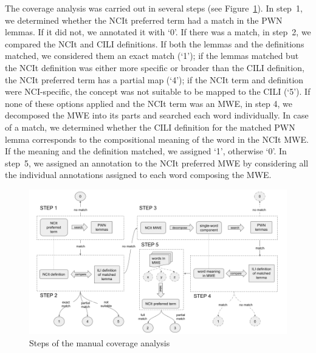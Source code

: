 \documentclass[11pt]{article}
\begin{document}
The coverage analysis was carried out in several steps (see Figure~\ref{steps}). 
In step~1, we determined whether the NCIt preferred term had a match in the PWN lemmas. If it did not, we annotated it with `0'. %
If there was a match, in step~2, we compared the NCIt and CILI definitions. If both the lemmas and the definitions matched, we considered them an exact match (`1'); if the lemmas matched but the NCIt definition was either more specific or broader than the CILI definition, the NCIt preferred term has a partial map (`4'); if the NCIt term and definition were NCI-specific, the concept was not suitable to be mapped to the CILI (`5'). If none of these options applied and the NCIt term was an MWE, in step 4, we decomposed the MWE into its parts and searched each word individually. In case of a match, we determined whether the CILI definition for the matched PWN lemma corresponds to the compositional meaning of the word in the NCIt MWE. If the meaning and the definition matched, we assigned `1',  otherwise `0'. In step~5, we assigned an annotation to the NCIt preferred MWE by considering all the individual annotations assigned to each word composing the MWE.

\begin{figure}[h]
\centering
 \includegraphics[scale=.4]{NCIt-ILI_manual_mapping} %
 \caption{Steps of the manual coverage analysis}
\label{steps}
\end{figure}
\end{document}
